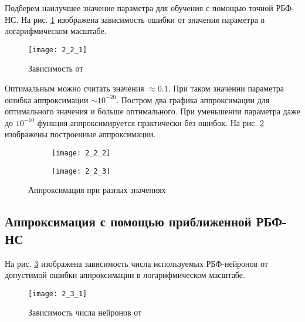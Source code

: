 Подберем наилучшее значение параметра  для обучения с помощью точной РБФ-НС. На рис. \ref{fig:2_2_1} изображена зависимость ошибки  от значения параметра  в логарифмическом масштабе. 
\begin{figure}[H]
\begin{center}
	\texttt{[image: 2\_2\_1]}
	\caption{Зависимость  от }
	\label{fig:2_2_1}
\end{center}
\end{figure}

Оптимальным можно считать значения  $\approx 0.1$. При таком значении параметра ошибка аппроксимации $\sim 10^{-20}$. Постром два графика аппроксимации для оптимального значения  и больше оптимального. При уменьшении параметра даже до $10^{-10}$ функция аппроксимируется практически без ошибок. На рис. \ref{fig:2_2_2} изображены построенные аппроксимации.
\begin{figure}[H]
\begin{center}
	\begin{subfigure}{0.49\textwidth}
		\texttt{[image: 2\_2\_2]}
		\caption{}
	\end{subfigure}
	\begin{subfigure}{0.49\textwidth}
		\texttt{[image: 2\_2\_3]}
		\caption{}
	\end{subfigure}
	\caption{Аппроксимация при разных значениях }
	\label{fig:2_2_2}
\end{center}
\end{figure}

\subsection{Аппроксимация с помощью приближенной РБФ-НС}


На рис. \ref{fig:2_3_1} изображена зависимость числа используемых РБФ-нейронов от допустимой ошибки аппроксимации  в логарифмическом масштабе.
\begin{figure}[H]
\begin{center}
	\texttt{[image: 2\_3\_1]}
	\caption{Зависимость числа нейронов от }
	\label{fig:2_3_1}
\end{center}
\end{figure}

